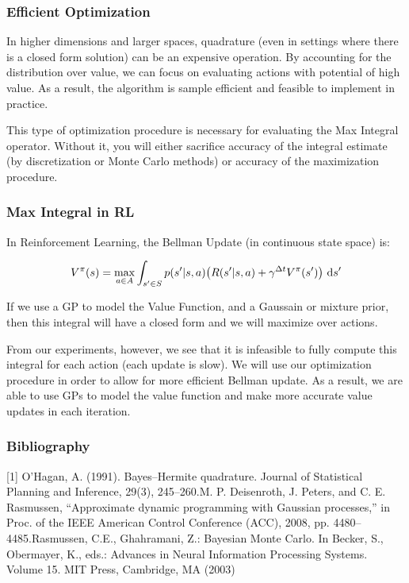 \documentclass[8pt]{beamer}
\begin{document}
\begin{frame}
\frametitle{Efficient Optimization}
In higher dimensions and larger spaces, quadrature (even in settings where there is a closed form solution) can be an expensive operation. By accounting for the distribution over value, we can focus on evaluating actions with potential of high value. As a result, the algorithm is sample efficient and feasible to implement in practice.\newline

This type of optimization procedure is necessary for evaluating the Max Integral operator. Without it, you will either sacrifice accuracy of the integral estimate (by discretization or Monte Carlo methods) or accuracy of the maximization procedure.\newline \newline
\end{frame}

\begin{frame}
\frametitle{Max Integral in RL}
In Reinforcement Learning, the Bellman Update (in continuous state space) is:

\[V^{\pi}(s) = \max_{a \in A} \int_{s' \in S} p(s'|s,a)\big(R(s'|s,a) + \gamma^{\Delta t}V^{\pi}(s')\big) \ \textup{d}s' \]

If we use a GP to model the Value Function, and a Gaussain or mixture prior, then this integral will have a closed form and we will maximize over actions.

From our experiments, however, we see that it is infeasible to fully compute this integral for each action (each update is slow). We will use our optimization procedure in order to allow for more efficient Bellman update. As a result, we are able to use GPs to model the value function and make more accurate value updates in each iteration.
\end{frame}



\begin{frame}
\frametitle{Bibliography}
[1] O’Hagan, A. (1991). Bayes–Hermite quadrature. Journal of Statistical Planning and Inference, 29(3), 245–260.\newline
[2]   M.  P.  Deisenroth,  J.  Peters,  and  C.  E.  Rasmussen,  “Approximate dynamic programming with Gaussian processes,” in Proc. of the IEEE American Control Conference (ACC), 2008, pp. 4480–4485.\newline
[3] Rasmussen, C.E., Ghahramani, Z.: Bayesian Monte Carlo. In Becker, S., Obermayer, K., eds.: Advances in Neural Information Processing Systems. Volume 15. MIT Press, Cambridge, MA (2003)
\end{frame}

 
\end{document}
